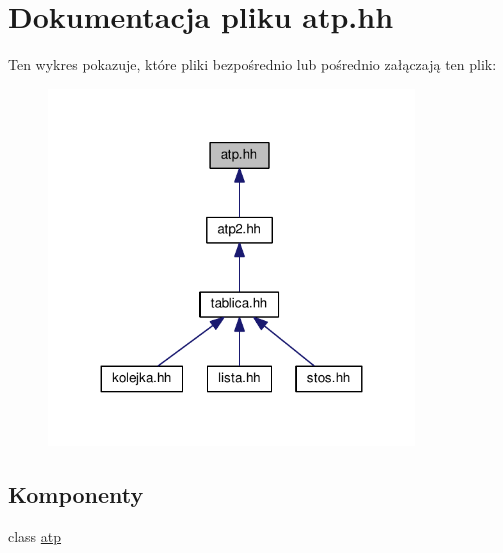 \hypertarget{atp_8hh}{}\section{Dokumentacja pliku atp.\+hh}
\label{atp_8hh}
Ten wykres pokazuje, które pliki bezpośrednio lub pośrednio załączają ten plik\+:
\nopagebreak
\begin{figure}[H]
\begin{center}
\leavevmode
\includegraphics[width=275pt]{atp_8hh__dep__incl}
\end{center}
\end{figure}
\subsection*{Komponenty}
\begin{DoxyCompactItemize}
\item 
class \hyperlink{classatp}{atp}
\end{DoxyCompactItemize}
